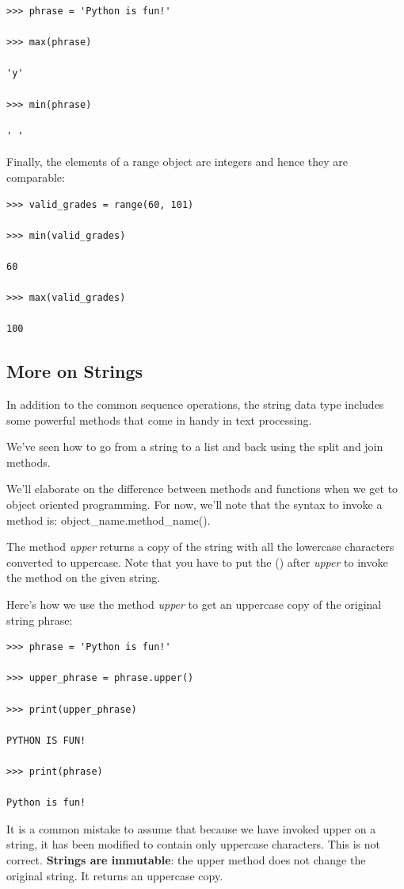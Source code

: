 \documentclass{article}
\begin{document}
\begin{lstlisting}
>>> phrase = 'Python is fun!'

>>> max(phrase)

'y'

>>> min(phrase)

' '
\end{lstlisting}

Finally, the elements of a range object are integers and hence they are comparable:

\begin{lstlisting}
>>> valid_grades = range(60, 101)

>>> min(valid_grades)

60

>>> max(valid_grades)

100
\end{lstlisting}

\subsection{More on Strings}

In addition to the common sequence operations, the string data type includes some powerful methods that come in handy in text processing.  

We've seen how to go from a string to a list and back using the split and join methods.

We'll elaborate on the difference between methods and functions when we get to object oriented programming.  For now, we'll note that the syntax to invoke a method is: object{\_}name.method{\_}name().

The method \textit{upper} returns a copy of the string with all the lowercase characters converted to uppercase.  Note that you have to put the () after \textit{upper} to invoke the method on the given string.  

Here's how we use the method \textit{upper} to get an uppercase copy of the original string phrase:

\begin{lstlisting}
>>> phrase = 'Python is fun!' 

>>> upper_phrase = phrase.upper()

>>> print(upper_phrase)

PYTHON IS FUN!

>>> print(phrase)

Python is fun!
\end{lstlisting}

It is a common mistake to assume that because we have invoked upper on a string, it has been modified to contain only uppercase characters.  This is not correct.  \textbf{Strings are immutable}:  the upper method does not change the original string.  It returns an uppercase copy.
\end{document}
